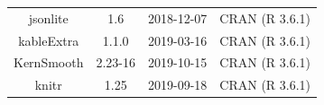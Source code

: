 \documentclass[11pt,]{book}
\begin{document}
\begin{longtable}[]{@{}cccc@{}}
\begin{minipage}[t]{0.18\columnwidth}
jsonlite\strut
\end{minipage} & \begin{minipage}[t]{0.19\columnwidth}\centering\strut
1.6\strut
\end{minipage} & \begin{minipage}[t]{0.16\columnwidth}\centering\strut
2018-12-07\strut
\end{minipage} & \begin{minipage}[t]{0.36\columnwidth}\centering\strut
CRAN (R 3.6.1)\strut
\end{minipage}\tabularnewline
\begin{minipage}[t]{0.18\columnwidth}\centering\strut
kableExtra\strut
\end{minipage} & \begin{minipage}[t]{0.19\columnwidth}\centering\strut
1.1.0\strut
\end{minipage} & \begin{minipage}[t]{0.16\columnwidth}\centering\strut
2019-03-16\strut
\end{minipage} & \begin{minipage}[t]{0.36\columnwidth}\centering\strut
CRAN (R 3.6.1)\strut
\end{minipage}\tabularnewline
\begin{minipage}[t]{0.18\columnwidth}\centering\strut
KernSmooth\strut
\end{minipage} & \begin{minipage}[t]{0.19\columnwidth}\centering\strut
2.23-16\strut
\end{minipage} & \begin{minipage}[t]{0.16\columnwidth}\centering\strut
2019-10-15\strut
\end{minipage} & \begin{minipage}[t]{0.36\columnwidth}\centering\strut
CRAN (R 3.6.1)\strut
\end{minipage}\tabularnewline
\begin{minipage}[t]{0.18\columnwidth}\centering\strut
knitr\strut
\end{minipage} & \begin{minipage}[t]{0.19\columnwidth}\centering\strut
1.25\strut
\end{minipage} & \begin{minipage}[t]{0.16\columnwidth}\centering\strut
2019-09-18\strut
\end{minipage} & \begin{minipage}[t]{0.36\columnwidth}\centering\strut
CRAN (R 3.6.1)\strut
\end{minipage}\tabularnewline

\end{longtable}
\end{document}
